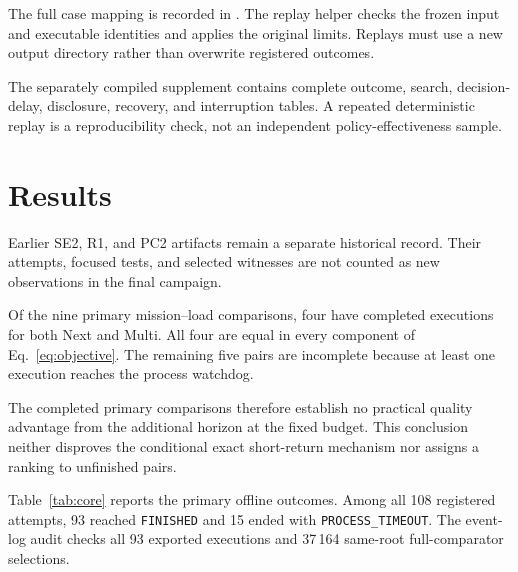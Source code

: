 \documentclass[conference]{IEEEtran}
\newcommand{\op}[1]{\texttt{#1}}
\begin{document}
The full case mapping is recorded in
.
The replay helper
checks the frozen input and executable identities and applies
the original limits.
Replays must use a new output directory rather than overwrite
registered outcomes.

The separately compiled supplement contains complete outcome,
search, decision-delay, disclosure, recovery, and interruption
tables.
A repeated deterministic replay is a reproducibility check,
not an independent policy-effectiveness sample.


\FloatBarrier


\section{Results}
\label{sec:results}

Earlier SE2, R1, and PC2 artifacts remain a separate historical
record.
Their attempts, focused tests, and selected witnesses are not
counted as new observations in the final campaign.

Of the nine primary mission--load comparisons, four have
completed executions for both Next and Multi.
All four are equal in every component of
Eq.~\eqref{eq:objective}.
The remaining five pairs are incomplete because at least one
execution reaches the process watchdog.

The completed primary comparisons therefore establish no
practical quality advantage from the additional horizon at
the fixed budget.
This conclusion neither disproves the conditional exact
short-return mechanism nor assigns a ranking to unfinished
pairs.

Table~\ref{tab:core} reports the primary offline outcomes.
Among all 108 registered attempts, 93 reached
\op{FINISHED} and 15 ended with
\op{PROCESS\_TIMEOUT}.
The event-log audit checks all 93 exported executions and
37\,164 same-root full-comparator selections.
\end{document}

